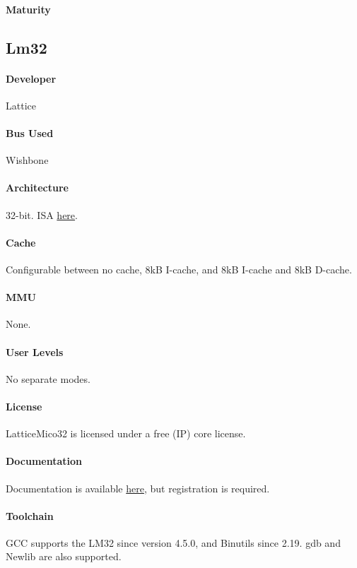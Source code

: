 \documentclass[11pt]{article} %
\begin{document}
\paragraph{Maturity} 

\subsection{Lm32}
\paragraph{Developer} Lattice
\paragraph{Bus Used} Wishbone
\paragraph{Architecture} 32-bit. ISA \href{http://sourceware.org/cgen/gen-doc/lm32-insn.html}{here}.
\paragraph{Cache} Configurable between no cache, 8kB I-cache, and 8kB I-cache and 8kB D-cache.
\paragraph{MMU} None.
\paragraph{User Levels} No separate modes.
\paragraph{License} LatticeMico32 is licensed under a free (IP) core license.
\paragraph{Documentation} Documentation is available \href{http://www.latticesemi.com/en/Products/DesignSoftwareAndIP/IntellectualProperty/IPCore/IPCores02/LatticeMico32.aspx#_B63AC1B3E7604B0DA4F80789A0B69A31}{here}, but registration is required.
\paragraph{Toolchain} GCC supports the LM32 since version 4.5.0, and Binutils since 2.19. gdb and Newlib are also supported.
\end{document}
